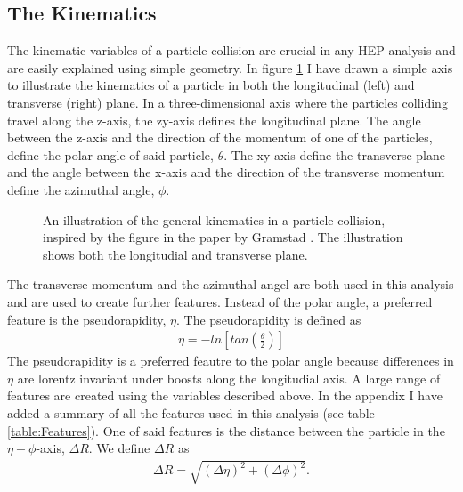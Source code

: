 \subsection{The Kinematics}
The kinematic variables of a particle collision are crucial in any \ac{HEP} analysis and are easily explained using simple 
geometry. In figure \ref{fig:Kinematics} I have drawn a simple axis to illustrate the kinematics of a particle in both the 
longitudinal (left) and transverse (right) plane. In a three-dimensional axis where the particles colliding travel along the 
z-axis, the zy-axis defines the longitudinal plane.  The angle between the z-axis and the direction of the momentum of
one of the particles, define the polar angle of said particle, $\theta$. The xy-axis define the transverse plane and the 
angle between the x-axis and the direction of the transverse momentum define the azimuthal angle, $\phi$.
\begin{figure}
    \centering
    \caption{An illustration of the general kinematics in a particle-collision, inspired by the 
    figure in the paper by Gramstad \cite{gramstad_searches_nodate}. The illustration shows both the 
    longitudial and transverse plane. }
    \label{fig:Kinematics}
\end{figure}
The transverse momentum and the azimuthal angel are both used in this analysis and are used to create further features. 
Instead of the polar angle, a preferred feature is the pseudorapidity, $\eta$. The pseudorapidity is defined as 
\begin{align}\label{eq:eta}
    \eta = -ln\left[tan\left(\frac{\theta}{2}\right)\right]
\end{align}
The pseudorapidity is a preferred feautre to the polar angle because differences in $\eta$ are lorentz invariant under boosts 
along the longitudial axis. A large range of features are created using the variables described above. In the appendix I have 
added a summary of all the features used in this analysis (see table \ref{table:Features}). One of said features is the distance 
between the particle in the $\eta-\phi$-axis, $\Delta R$. We define $\Delta R$ as 
\begin{align}
    \Delta R = \sqrt{(\Delta \eta)^2 + (\Delta \phi)^2}.
\end{align}

